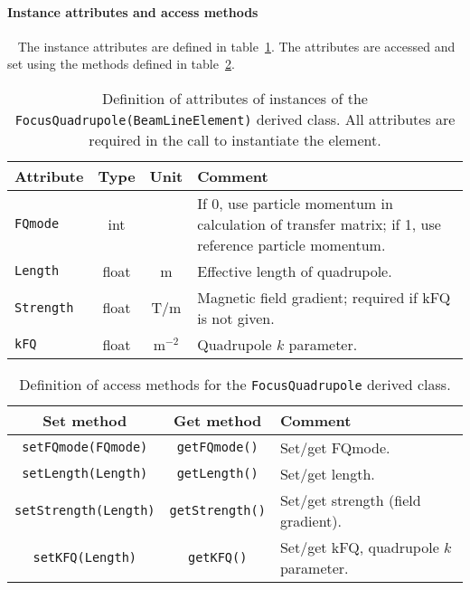 \paragraph{Instance attributes and access methods} ~\newline
\label{SubSubSect:FQuad:InstAttr}
\noindent
The instance attributes are defined in
table~\ref{Tab:FQuad:Attributes}. 
The attributes are accessed and set using the methods defined in
table~\ref{Tab:FQuad:Methods}.
\begin{table}[h]
  \caption{
    Definition of attributes of instances of
    the \texttt{FocusQuadrupole(BeamLineElement)} derived class.
    All attributes are required in the call to instantiate the
    element.
  }
  \label{Tab:FQuad:Attributes}
  \begin{center}
    \begin{tabular}{|l|c|c|p{10cm}|}
      \hline
      \textbf{Attribute}   & \textbf{Type} & \textbf{Unit} & \textbf{Comment}                    \\
      \hline
      \texttt{FQmode}   & int   &       & If 0, use particle momentum in calculation of transfer
                                          matrix; if 1, use reference particle momentum.         \\
      \texttt{Length}   & float & m     & Effective length of quadrupole.                        \\
      \texttt{Strength} & float & T/m   & Magnetic field gradient; required if kFQ is not given. \\
      \texttt{kFQ}      & float & m$^{-2}$ & Quadrupole $k$ parameter.                               \\
      \hline
    \end{tabular}
  \end{center}
\end{table}
\begin{table}[h]
  \caption{
    Definition of access methods for the \texttt{FocusQuadrupole} derived
    class. 
  }
  \label{Tab:FQuad:Methods}
  \begin{center}
    \begin{tabular}{|c|c|p{7cm}|}
      \hline
      \textbf{Set method} & \textbf{Get method}  & \textbf{Comment}                                    \\
      \hline
      \texttt{setFQmode(FQmode)}   & \texttt{getFQmode()}   & Set/get FQmode.                        \\
      \texttt{setLength(Length)}   & \texttt{getLength()}   & Set/get length.                        \\
      \texttt{setStrength(Length)} & \texttt{getStrength()} & Set/get strength (field gradient).     \\
      \texttt{setKFQ(Length)}      & \texttt{getKFQ()}      & Set/get kFQ, quadrupole $k$ parameter. \\
      \hline
    \end{tabular}
  \end{center}
\end{table}

